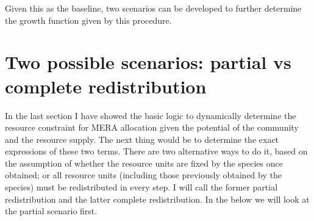 \documentclass[12pt]{article}
\begin{document}
Given this as the baseline, two scenarios can be developed to further determine the growth function given by this procedure.

\section{Two possible scenarios: partial vs complete redistribution}
In the last section I have showed the basic logic to dynamically determine the resource constraint for MERA allocation given the potential of the community and the resource supply. The next thing would be to determine the exact expressions of these two terms. There are two alternative ways to do it, based on the assumption of whether the resource units are fixed by the species once obtained; or all resource units (including those previously obtained by the species) must be redistributed in every step. I will call the former partial redistribution and the latter complete redistribution. In the below we will look at the partial scenario first.
\end{document}
